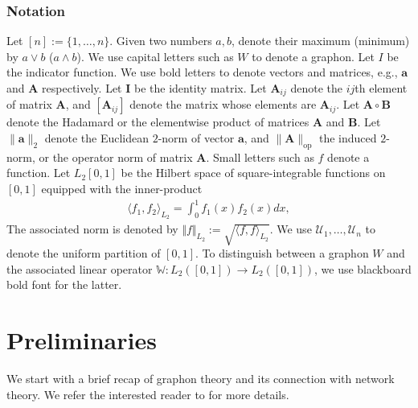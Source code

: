 \documentclass[11pt]{article}
\newcommand{\bbR}{\mathbb{R}}
\newcommand{\U}{\mathcal{U}}
\newcommand{\op}{\mathrm{op}}
\newcommand{\bA}{\bm{A}}
\newcommand{\bB}{\bm{B}}
\newcommand{\ba}{\bm{a}}
\newcommand{\bI}{\bm{I}}
\newcommand{\bbW}{\mathbb{W}}
\newcommand{\<}{\langle}
\renewcommand{\>}{\rangle}
\theoremstyle{plain}
\theoremstyle{definition}
\theoremstyle{remark}
\begin{document}
\subsubsection*{Notation}
Let $[n] := \{1, \dots, n\}$. Given two numbers $a, b$, denote their maximum (minimum) by $a \vee b$ ($a \wedge b$).
We use capital letters such as $W$ to denote a graphon. Let $I$ be the indicator function. We use bold letters to denote vectors and matrices, e.g., $\ba$ and $\bA$ respectively. Let $\bI$ be the identity matrix. Let $\bA_{ij}$ denote the $ij$th element of matrix $\bA$, and $[\bA_{ij}]$ denote the matrix whose elements are $\bA_{ij}$. Let $\bA \circ \bB$ denote the Hadamard or the elementwise product of matrices $\bA$ and $\bB$. 
Let $\|\ba\|_2$ denote the Euclidean $2$-norm of vector $\ba$, and $\|\bA\|_{\op}$ the induced $2$-norm, or the operator norm of matrix $\bA$. 
Small letters such as $f$ denote a function. Let $L_2[0,1]$ be the Hilbert space of square-integrable functions on $[0,1]$ equipped with the inner-product
\begin{align*}
    \langle f_1, f_2 \rangle_{L_2} = \int_0^1 f_1(x) f_2(x) dx,
\end{align*}
The associated norm is denoted by $\Vert f \Vert_{L_2} := \sqrt{\langle f, f \rangle_{L_2}}$.
We use $\U_1, \dots, \U_n$ to denote the uniform partition of $[0,1]$. To distinguish between a graphon $W$ and the associated linear operator $\bbW: L_2([0, 1]) \to L_2([0,1])$, we use blackboard bold font for the latter.



\section{Preliminaries}
\label{section: preliminaries}

We start with a brief recap of graphon theory and  its connection with network theory. We refer the interested reader to \cite{lovasz} for more details.
\end{document}

